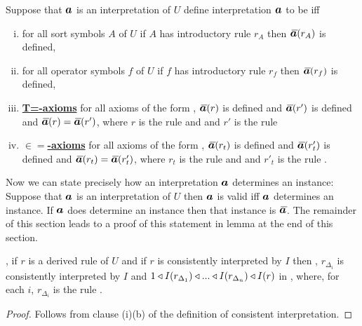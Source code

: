 \begin{definition}
 Suppose that $\iI$ is an interpretation of $U$  
define interpretation $\iI$ to be   iff 

\begin{enumerate}[(i)]
\item
for all sort symbols $A$ of $U$ if $A$ has introductory rule $r_A$ then $\Ibar(r_A)$ is defined,
\item  
for all operator symbols $f$ of $U$ if $f$ has introductory rule $r_f$ then $\Ibar(r_f)$ is defined,

\item \underline{\textbf{T=-axioms}} 
for all axioms of the form
 ,
$\Ibar(r)$ is defined and $\Ibar(r')$ is defined and
$\Ibar(r) = \Ibar(r')$, where $r$ is the rule
\ZDelta and  
and $r'$ is the rule \ZDeltap[,]

\item \underline{\textbf{$\boldsymbol{\in=}$-axioms}} 
for all axioms  of the form
,
$\Ibar(r_t)$ is defined and  $\Ibar(r'_t)$ is defined and
$\Ibar(r_t) = \Ibar(r'_t)$, where $r_t$ is the rule
\ZtDelta and  
and $r'_t$ is the rule .
\end{enumerate}
\end{definition}

Now we can state precisely how an interpretation $\iI$ determines an instance: 
Suppose that $\iI$ is an interpretation of $U$  then $\iI$ is valid  iff $\iI$ determines an instance. 
If $\iI$ does determine an instance then that instance is $\Ibar$.
The remainder of this section leads to a proof of this statement in
lemma   at the end of this section.

\begin{lemma}
\IfIpartialmappingUtoC, if $r$ is a derived rule \ZDelta of $U$ and if
$r$ is consistently interpreted by $I$ 
then \foreachi, $r_{\Delta_i}$ is consistently interpreted by $I$ and 
$1 \triangleleft I(r_{\Delta_1}) \triangleleft ... \triangleleft I(r_{\Delta_n}) \triangleleft I(r)$ in \catc,
where, for each $i$, $r_{\Delta_i}$ is the rule .
\end{lemma}
\begin{proof}
Follows from clause (i)(b) of the definition of consistent interpretation.
\end{proof}

